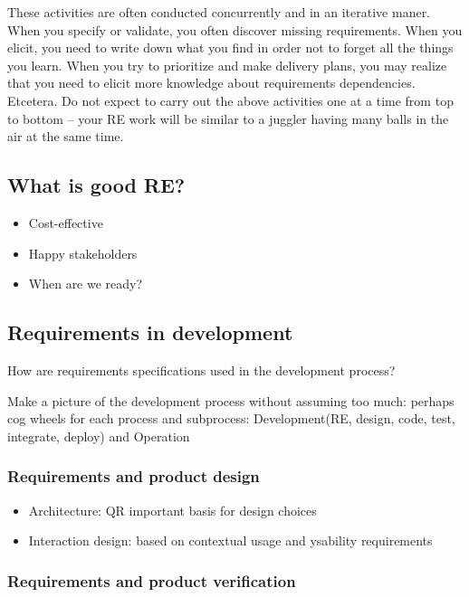These activities are often conducted concurrently and in an iterative maner. When you specify or validate, you often discover missing requirements. When you elicit, you need to write down what you find in order not to forget all the things you learn. When you try to prioritize and make delivery plans, you may realize that you need to elicit more knowledge about requirements dependencies. Etcetera. Do not expect to carry out the above activities one at a time from top to bottom -- your RE work will be similar to a juggler having many balls in the air at the same time. 

\subsection{What is good RE?}

\begin{itemize}
  \item Cost-effective
  \item Happy stakeholders
  \item When are we ready?
\end{itemize}

\subsection{Requirements in development}
How are requirements specifications used in the development process?

\TODO Make a picture of the development process without assuming too much: perhaps cog wheels for each process and subprocess: Development(RE, design, code, test, integrate, deploy) and Operation 

\subsubsection{Requirements and product design}

\begin{itemize}
  \item Architecture: QR important basis for design choices
  \item Interaction design: based on contextual usage and ysability requirements
\end{itemize}


\subsubsection{Requirements and product verification}

